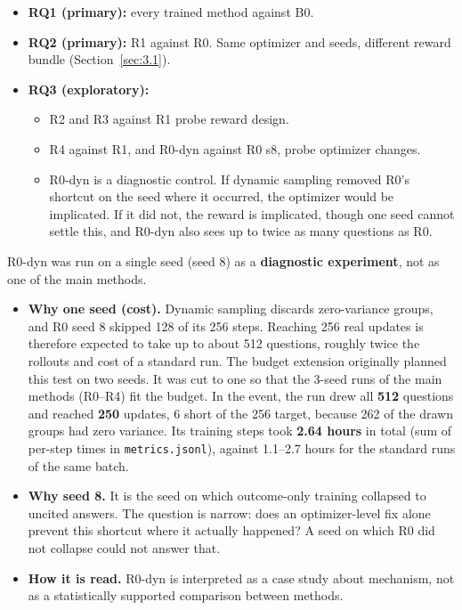 \begin{itemize}
\tightlist
\item
  \textbf{RQ1 (primary):} every trained method against B0.
\item
  \textbf{RQ2 (primary):} R1 against R0. Same optimizer and seeds,
  different reward bundle (Section~\ref{sec:3.1}).
\item
  \textbf{RQ3 (exploratory):}

  \begin{itemize}
  \tightlist
  \item
    R2 and R3 against R1 probe reward design.
  \item
    R4 against R1, and R0-dyn against R0 s8, probe optimizer changes.
  \item
    R0-dyn is a diagnostic control. If dynamic sampling removed R0's
    shortcut on the seed where it occurred, the optimizer would be
    implicated. If it did not, the reward is implicated, though one seed
    cannot settle this, and R0-dyn also sees up to twice as many
    questions as R0.
  \end{itemize}
\end{itemize}

R0-dyn was run on a single seed (seed 8) as a \textbf{diagnostic
experiment}, not as one of the main methods.

\begin{itemize}
\tightlist
\item
  \textbf{Why one seed (cost).} Dynamic sampling discards zero-variance
  groups, and R0 seed 8 skipped 128 of its 256 steps. Reaching 256 real
  updates is therefore expected to take up to about 512 questions,
  roughly twice the rollouts and cost of a standard run. The budget
  extension originally planned this test on two seeds. It was cut to one
  so that the 3-seed runs of the main methods (R0--R4) fit the budget.
  In the event, the run drew all \textbf{512} questions and reached
  \textbf{250} updates, 6 short of the 256 target, because 262 of the
  drawn groups had zero variance. Its training steps took \textbf{2.64
  hours} in total (sum of per-step times in
  \texttt{metrics.\allowbreak{}jsonl}), against 1.1--2.7 hours for the
  standard runs of the same batch.
\item
  \textbf{Why seed 8.} It is the seed on which outcome-only training
  collapsed to uncited answers. The question is narrow: does an
  optimizer-level fix alone prevent this shortcut where it actually
  happened? A seed on which R0 did not collapse could not answer that.
\item
  \textbf{How it is read.} R0-dyn is interpreted as a case study about
  mechanism, not as a statistically supported comparison between
  methods.
\end{itemize}

